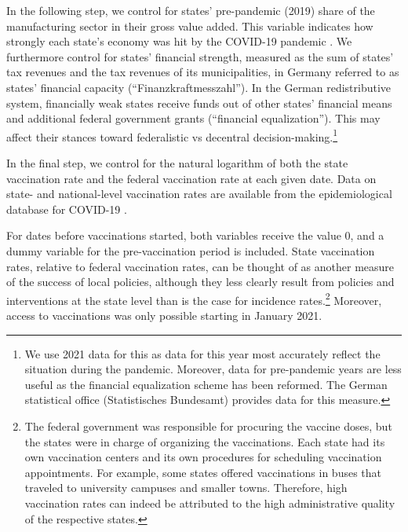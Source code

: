 \documentclass[12pt, abstracton]{scrartcl}
\begin{document}
In the following step, we control for states’ pre-pandemic (2019) share of the manufacturing sector in their gross value added. This variable indicates how strongly each state’s economy was hit by the COVID-19 pandemic \citep{Flach2020}. We furthermore control for states’ financial strength, measured as the sum of states’ tax revenues and the tax revenues of its municipalities, in Germany referred to as states’ financial capacity (“Finanzkraftmesszahl”). In the German redistributive system, financially weak states receive funds out of other states' financial means and additional federal government grants (“financial equalization”). This may affect their stances toward federalistic vs decentral decision-making.\footnote{
	We use 2021 data for this as data for this year most accurately reflect the situation during the pandemic. Moreover, data for pre-pandemic years are less useful as the financial equalization scheme has been reformed. The German statistical office (Statistisches Bundesamt) provides data for this measure.
}  %

In the final step, we control for the natural logarithm of both the state vaccination rate and the federal vaccination rate at each given date. Data on state- and national-level vaccination rates are available from the epidemiological database for COVID-19 \citep{Guidotti2022}. %

For dates before vaccinations started, both variables receive the value $0$, and a dummy variable for the pre-vaccination period is included. State vaccination rates, relative to federal vaccination rates, can be thought of as another measure of the success of local policies, although they less clearly result from policies and interventions at the state level than is the case for incidence rates.\footnote{
	The federal government was responsible for procuring the vaccine doses, but the states were in charge of organizing the vaccinations. Each state had its own vaccination centers and its own procedures for scheduling vaccination appointments. For example, some states offered vaccinations in buses that traveled to university campuses and smaller towns. Therefore, high vaccination rates can indeed be attributed to the high administrative quality of the respective states.
} Moreover, access to vaccinations was only possible starting in January 2021.  %
\end{document}

